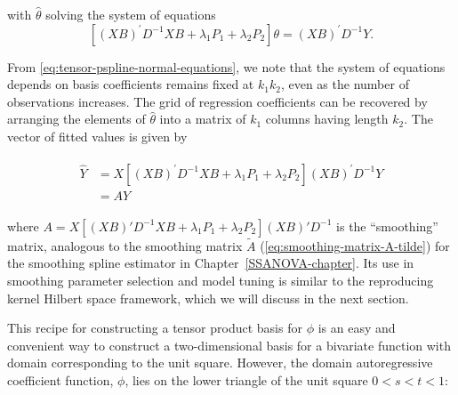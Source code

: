 \noindent
with $\hat{\theta}$ solving the system of equations 
\begin{equation} \label{eq:tensor-pspline-normal-equations}
\left[ \left(XB\right)^\prime D^{-1} XB +  \lambda_1 P_1+ \lambda_2 P_2\right]\theta = \left(X B\right)^\prime D^{-1}Y.
\end{equation}

\noindent
From \ref{eq:tensor-pspline-normal-equations}, we note that the system of equations depends on basis coefficients remains fixed at $k_1 k_2$, even as the number of observations increases. The grid of regression coefficients can be recovered by arranging the elements of $\hat{\theta}$ into a matrix of $k_1$ columns having length $k_2$. The vector of fitted values is given by 

\begin{align}
\begin{split} \label{eq:pspline-smoothing-matrix}
\hat{Y} &= X \left[ \left(XB\right)^\prime D^{-1} XB +  \lambda_1 P_1+ \lambda_2 P_2\right] \left(X B\right)^\prime D^{-1}Y\\
&= AY
\end{split}
\end{align}

\noindent
where $A = X \left[ \left(XB\right)' D^{-1} XB +  \lambda_1 P_1+ \lambda_2 P_2\right] \left(X B\right)' D^{-1}$ is the ``smoothing'' matrix, analogous to the smoothing matrix $\tilde{A}$ (\ref{eq:smoothing-matrix-A-tilde}) for the smoothing spline estimator in Chapter~\ref{SSANOVA-chapter}. Its use in smoothing parameter selection and model tuning is similar to the reproducing kernel Hilbert space framework, which we will discuss in the next section.

\bigskip

This recipe for constructing a tensor product basis for $\phi$ is an easy and convenient way to construct a two-dimensional basis for a bivariate function with domain corresponding to the unit square. However, the domain autoregressive coefficient function, $\phi$, lies on the lower triangle of the unit square $0 < s < t < 1$:

